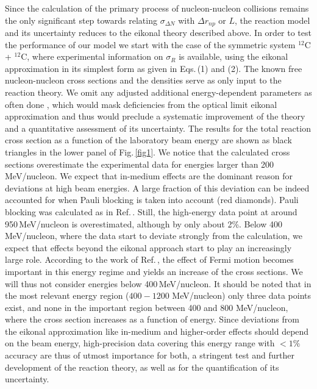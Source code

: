 \documentclass[english,aps,prl,twocolumn,superscriptaddress]{revtex4}
\begin{document}
Since the calculation of the primary process of nucleon-nucleon collisions remains the only significant step towards relating $\sigma_{\Delta N}$  with $\Delta r_{np}$ or $L$, the reaction model and its uncertainty reduces to the eikonal theory described above. In order to test the performance of our model we start with the case of the symmetric system $^{12}$C + $^{12}$C, where experimental information on $\sigma_R$ is available, using the eikonal approximation in its simplest form as given in Eqs.\,(1) and (2). The known free nucleon-nucleon cross sections and the densities serve as only input to the reaction theory. We omit any adjusted additional energy-dependent parameters as often done \cite{Ray79,Hor07,Kan16}, which would mask deficiencies from the optical limit eikonal approximation and thus would preclude a systematic improvement of the theory and a quantitative assessment of its uncertainty. The results for the total reaction cross section as a function of the laboratory beam energy are shown as black triangles in the lower panel of Fig.\,\ref{fig1}. We notice that the calculated cross sections overestimate the experimental data for energies larger than 200 MeV/nucleon. We expect that in-medium effects are the dominant reason for deviations at high beam energies. A large fraction of this deviation can be indeed accounted for when Pauli blocking is taken into account (red diamonds). Pauli blocking was calculated as in Ref.\,\cite{BC10}. Still, the high-energy data point at around 950\,MeV/nucleon is overestimated, although by only about 2\%. Below 400 MeV/nucleon, where the data start to deviate strongly from the calculation, we expect that effects beyond the eikonal approach start to play an increasingly large role. According to the work of Ref.\,\cite{Tak09}, the effect of Fermi motion becomes important in this energy regime and yields an increase of the cross sections. We will thus not consider energies below 400\,MeV/nucleon. It should be noted that in the most relevant energy region ($400-1200$ MeV/nucleon) only three data points exist, and none in the important region between 400 and 800 MeV/nucleon, where the cross section increases as a function of energy. Since deviations from the eikonal approximation like in-medium and higher-order effects should depend on the beam energy, high-precision data covering this energy range with $<1\%$ accuracy are thus of utmost importance for both, a stringent test and further development of the reaction theory, as well as for the quantification of its uncertainty. 
\end{document}
